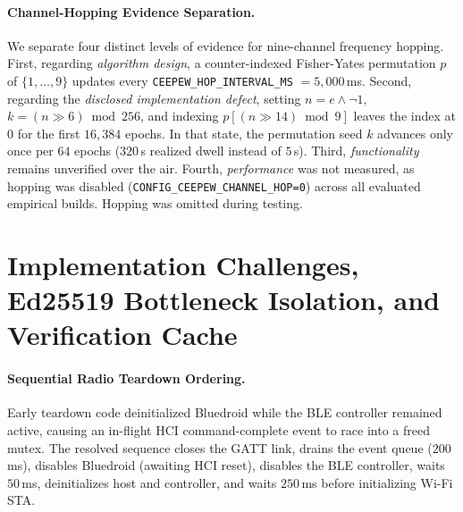 \documentclass[conference]{IEEEtran}
\begin{document}
\paragraph{Channel-Hopping Evidence Separation.} We separate four distinct levels of evidence for nine-channel frequency hopping. First, regarding \textit{algorithm design}, a counter-indexed Fisher-Yates permutation $p$ of $\{1,\dots,9\}$ updates every \texttt{CEEPEW\_HOP\_INTERVAL\_MS} $= 5{,}000$\,ms. Second, regarding the \textit{disclosed implementation defect}, setting $n = e \wedge \neg 1$, $k = (n \gg 6) \bmod 256$, and indexing $p[(n \gg 14) \bmod 9]$ leaves the index at $0$ for the first $16{,}384$ epochs. In that state, the permutation seed $k$ advances only once per $64$ epochs ($320$\,s realized dwell instead of $5$\,s). Third, \textit{functionality} remains unverified over the air. Fourth, \textit{performance} was not measured, as hopping was disabled (\texttt{CONFIG\_CEEPEW\_CHANNEL\_HOP=0}) across all evaluated empirical builds. Hopping was omitted during testing.

\section{Implementation Challenges, Ed25519 Bottleneck Isolation, and Verification Cache}

\paragraph{Sequential Radio Teardown Ordering.} Early teardown code deinitialized Bluedroid while the BLE controller remained active, causing an in-flight HCI command-complete event to race into a freed mutex. The resolved sequence closes the GATT link, drains the event queue ($200$\,ms), disables Bluedroid (awaiting HCI reset), disables the BLE controller, waits $50$\,ms, deinitializes host and controller, and waits $250$\,ms before initializing Wi-Fi STA.
\end{document}
